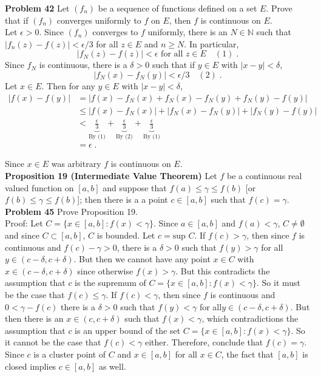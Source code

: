 \documentclass[a4paper]{article}
\begin{document}
{\bf Problem 42}
Let $(f_n)$ be a sequence of functions defined on a set $E$. Prove that if $(f_n)$ converges uniformly to $f$ on $E$, then $f$ is continuous on $E$. \\

Let $\epsilon>0$. Since $(f_n)$ converges to $f$ uniformly, there is an $N \in \mathbb{N}$ such that $|f_n(z) - f(z)| < \epsilon / 3$ for all $z \in E$ and $n\geq N$. In particular, $$|f_N(z) - f(z)| < \epsilon \text{ for all } z \in E \quad (1) \;.$$ Since $f_N$ is continuous, there is a $\delta > 0$ such that if $y \in E$ with $|x-y| < \delta$,
$$|f_N(x)-f_N(y)| < \epsilon / 3 \quad (2) \;.$$
Let $x \in E$. Then for any $y \in E$ with $|x-y|<\delta$,
\begin{align*}
|f(x) - f(y)| &= |f(x) -f_N(x) + f_N(x) -f_N(y) + f_N(y) - f(y)| \\
&\leq |f(x) -f_N(x)| + |f_N(x) -f_N(y)| + |f_N(y) - f(y)| \\
&< \underbrace{\frac{\epsilon}{3}}_{\text{By (1)}} + \underbrace{\frac{\epsilon}{3}}_{\text{By (2)}} +\underbrace{\frac{\epsilon}{3}}_{\text{By (1)}}\\
&= \epsilon \;.
\end{align*}

Since $x \in E$ was arbitrary $f$ is continuous on $E$. \\

{\bf Proposition 19 (Intermediate Value Theorem)} Let $f$ be a continuous real valued function on $[a,b]$ and suppose that $f(a) \leq \gamma \leq f(b)$ [or $f(b) \leq \gamma \leq f(b)$]; then there is a a point $c \in [a,b]$ such that $f(c) = \gamma$. \\
 
{\bf Problem 45} Prove Proposition 19. \\

Proof: Let $C = \{x \in [a,b] : f(x) < \gamma\}$. Since $a \in [a,b]$ and $f(a) < \gamma$, $C \neq \emptyset$ and since $C \subset [a,b]$, $C$ is bounded. Let $c = \text{sup } C$. If $f(c) > \gamma$, then since $f$ is continuous and $f(c) - \gamma > 0$, there is a $\delta > 0$ such that $f(y) > \gamma$ for all $y \in (c-\delta, c+\delta)$. But then we cannot have any point $x \in C$ with $x \in ( c- \delta, c+\delta)$ since otherwise $f(x) > \gamma$. But this contradicts the assumption that $c$ is the supremum of $C = \{x \in [a,b] : f(x) < \gamma\}$. So it must be the case that $f(c) \leq \gamma$. If $f(c) < \gamma$, then since $f$ is continuous and $0<\gamma - f(c)$ there is a $\delta > 0$ such that $f(y) < \gamma$ for all$y \in (c-\delta, c+\delta)$. But then there is an $x \in (c,c+\delta)$ such that $f(x) < \gamma$, which contradictions the assumption that $c$ is an upper bound of the set $C = \{x \in [a,b] : f(x) < \gamma\}$. So it cannot be the case that $f(c) < \gamma$ either. Therefore, conclude that $f(c) = \gamma$. Since $c$ is a cluster point of $C$ and $x\in [a,b]$ for all $x \in C$, the fact that $[a,b]$ is closed implies $c \in [a,b]$ as well. \\
\end{document}

